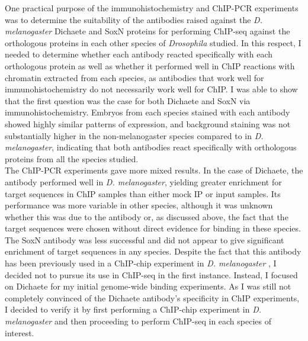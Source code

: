 One practical purpose of the immunohistochemistry and ChIP-PCR experiments was to determine the suitability of the antibodies raised against the \emph{D. melanogaster} Dichaete and SoxN proteins for performing ChIP-seq against the orthologous proteins in each other species of \emph{Drosophila} studied. In this respect, I needed to determine whether each antibody reacted specifically with each orthologous protein as well as whether it performed well in ChIP reactions with chromatin extracted from each species, as antibodies that work well for immunohistochemistry do not necessarily work well for ChIP. I was able to show that the first question was the case for both Dichaete and SoxN via immunohistochemistry. Embryos from each species stained with each antibody showed highly similar patterns of expression, and background staining was not substantially higher in the non-melanogaster species compared to in \emph{D. melanogaster}, indicating that both antibodies react specifically with orthologous proteins from all the species studied.\\

The ChIP-PCR experiments gave more mixed results. In the case of Dichaete, the antibody performed well in \emph{D. melanogaster}, yielding greater enrichment for target sequences in ChIP samples than either mock IP or input samples. Its performance was more variable in other species, although it was unknown whether this was due to the antibody or, as discussed above, the fact that the target sequences were chosen without direct evidence for binding in these species. The SoxN antibody was less successful and did not appear to give significant enrichment of target sequences in any species. Despite the fact that this antibody has been previously used in a ChIP-chip experiment in \emph{D. melanogaster} \citep{ferrero_soxneuro_2014}, I decided not to pursue its use in ChIP-seq in the first instance. Instead, I focused on Dichaete for my initial genome-wide binding experiments. As I was still not completely convinced of the Dichaete antibody’s specificity in ChIP experiments, I decided to verify it by first performing a ChIP-chip experiment in \emph{D. melanogaster} and then proceeding to perform ChIP-seq in each species of interest.\\
 
